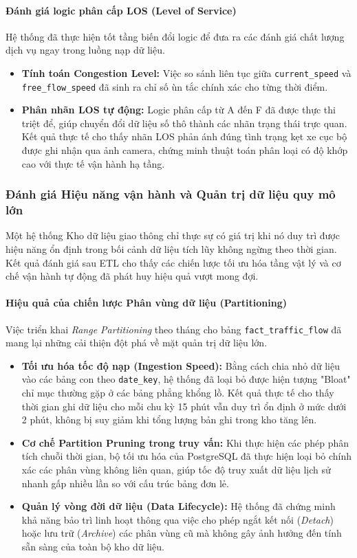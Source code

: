 \paragraph{Đánh giá logic phân cấp LOS (Level of Service)}
Hệ thống đã thực hiện tốt tầng biến đổi logic để đưa ra các đánh giá chất lượng dịch vụ ngay trong luồng nạp dữ liệu.
\begin{itemize}
    \item \textbf{Tính toán Congestion Level:} Việc so sánh liên tục giữa \texttt{current\_speed} và \texttt{free\_flow\_speed} đã sinh ra chỉ số ùn tắc chính xác cho từng thời điểm.
    \item \textbf{Phân nhãn LOS tự động:} Logic phân cấp từ A đến F đã được thực thi triệt để, giúp chuyển đổi dữ liệu số thô thành các nhãn trạng thái trực quan. Kết quả thực tế cho thấy nhãn LOS phản ánh đúng tình trạng kẹt xe cục bộ được ghi nhận qua ảnh camera, chứng minh thuật toán phân loại có độ khớp cao với thực tế vận hành hạ tầng.
\end{itemize}

\subsubsection{ Đánh giá Hiệu năng vận hành và Quản trị dữ liệu quy mô lớn}

Một hệ thống Kho dữ liệu giao thông chỉ thực sự có giá trị khi nó duy trì được hiệu năng ổn định trong bối cảnh dữ liệu tích lũy không ngừng theo thời gian. Kết quả đánh giá sau ETL cho thấy các chiến lược tối ưu hóa tầng vật lý và cơ chế vận hành tự động đã phát huy hiệu quả vượt mong đợi.

\paragraph{ Hiệu quả của chiến lược Phân vùng dữ liệu (Partitioning)}
Việc triển khai \textit{Range Partitioning} theo tháng cho bảng \texttt{fact\_traffic\_flow} đã mang lại những cải thiện đột phá về mặt quản trị dữ liệu lớn.
\begin{itemize}
    \item \textbf{Tối ưu hóa tốc độ nạp (Ingestion Speed):} Bằng cách chia nhỏ dữ liệu vào các bảng con theo \texttt{date\_key}, hệ thống đã loại bỏ được hiện tượng "Bloat" chỉ mục thường gặp ở các bảng phẳng khổng lồ. Kết quả thực tế cho thấy thời gian ghi dữ liệu cho mỗi chu kỳ 15 phút vẫn duy trì ổn định ở mức dưới 2 phút, không bị suy giảm khi tổng lượng bản ghi trong kho tăng lên.
    \item \textbf{Cơ chế Partition Pruning trong truy vấn:} Khi thực hiện các phép phân tích chuỗi thời gian, bộ tối ưu hóa của PostgreSQL đã thực hiện loại bỏ chính xác các phân vùng không liên quan, giúp tốc độ truy xuất dữ liệu lịch sử nhanh gấp nhiều lần so với cấu trúc bảng đơn lẻ.
    \item \textbf{Quản lý vòng đời dữ liệu (Data Lifecycle):} Hệ thống đã chứng minh khả năng bảo trì linh hoạt thông qua việc cho phép ngắt kết nối (\textit{Detach}) hoặc lưu trữ (\textit{Archive}) các phân vùng cũ mà không gây ảnh hưởng đến tính sẵn sàng của toàn bộ kho dữ liệu.
\end{itemize}

